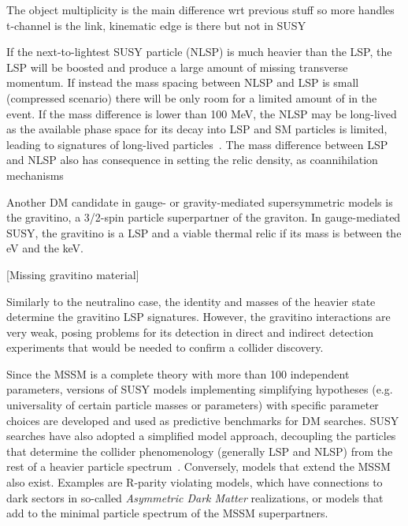The object multiplicity is the main difference wrt previous stuff so more handles
t-channel is the link, kinematic edge is there but not in SUSY

If the next-to-lightest SUSY particle (NLSP) is much heavier than the LSP, the LSP will be boosted and produce
a large amount of missing transverse momentum. If instead the mass spacing between NLSP and LSP is 
small (compressed scenario) there will be only room for a limited amount of \MET in the event.
If the mass difference is lower than 100 MeV, the NLSP may be long-lived as the available phase space
for its decay into LSP and SM particles is limited, %
leading to signatures of long-lived particles~\cite{Chen:1995yu}. The mass difference
between LSP and NLSP also has consequence in setting the relic density, as coannihilation mechanisms

Another DM candidate in gauge- or gravity-mediated supersymmetric models is the gravitino, 
a 3/2-spin particle superpartner of the graviton. 
In gauge-mediated SUSY, the gravitino is a LSP and a viable thermal relic if its mass is between the eV and the keV. 

[Missing gravitino material]

Similarly to the neutralino case, the identity and masses of the heavier state determine the
gravitino LSP signatures. However, the gravitino interactions are very weak, posing problems for 
its detection in direct and indirect detection experiments that would be needed to confirm 
a collider discovery. 


Since the MSSM is a complete theory with more than 100 independent parameters, 
versions of SUSY models implementing simplifying hypotheses (e.g. universality of certain
particle masses or parameters) with specific parameter choices 
are developed and used as predictive benchmarks for DM searches. 
SUSY searches have also adopted a simplified
model approach, decoupling the particles that determine the collider
phenomenology (generally LSP and NLSP)
from the rest of a heavier particle spectrum~\cite{Alves:2011wf}. 
Conversely, models that extend the MSSM also exist. Examples are R-parity violating models, 
which have connections to dark sectors in so-called \textit{Asymmetric Dark Matter} realizations, 
or models that add to the minimal particle spectrum of the MSSM superpartners. 

